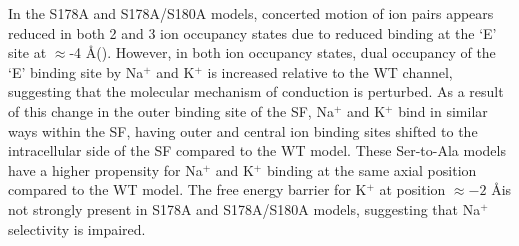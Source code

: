 \begin{refsection}
In the S178A and S178A/S180A models, concerted motion of ion pairs appears reduced in both 2 and 3 ion occupancy states due to reduced binding at the `E' site at $\approx$-4 \AA (). However, in both ion occupancy states, dual occupancy of the `E' binding site by Na$^+$ and K$^+$ is increased relative to the WT channel, suggesting that the molecular mechanism of conduction is perturbed. As a result of this change in the outer binding site of the SF, Na$^+$ and K$^+$ bind in similar ways within the SF, having outer and central ion binding sites shifted to the intracellular side of the SF compared to the WT model. These Ser-to-Ala models have a higher propensity for Na$^+$ and K$^+$ binding at the same axial position compared to the WT model. The free energy barrier for K$^+$ at position $\approx -2$ \AA is not strongly present in S178A and S178A/S180A models, suggesting that Na$^+$ selectivity is impaired. 


\end{refsection}
